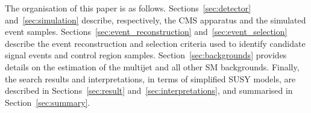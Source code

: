 The organisation of this paper is as
follows. Sections~\ref{sec:detector} and~\ref{sec:simulation}
describe, respectively, the CMS apparatus and the simulated event
samples. Sections~\ref{sec:event_reconstruction}
and~\ref{sec:event_selection} describe the event reconstruction and
selection criteria used to identify candidate signal events and
control region samples. Section~\ref{sec:backgrounds} provides details
on the estimation of the multijet and all other SM
backgrounds. Finally, the search results and interpretations, in terms
of simplified SUSY models, are described in
Sections~\ref{sec:result} and~\ref{sec:interpretations}, and
summarised in Section~\ref{sec:summary}.



